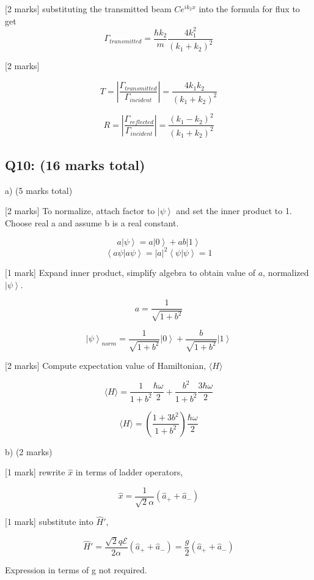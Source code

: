 \documentclass[a4paper,11pt]{article}
\begin{document}
[2 marks] substituting the transmitted beam \( Ce^{ik_{2}x} \) into the formula for flux to get \[\Gamma_{transmitted} = \frac{\hbar k_{2}}{m} \frac{4k_{1}^{2}}{ \left(k_{1} + k_{2} \right)^{2}} \]

[2 marks]

\[ T = \left|\frac{\Gamma_{transmitted}}{\Gamma_{incident}} \right| = \frac{4k_{1}k_{2}}{(k_{1}+k_{2})^{2}} \]

\[R = \left|\frac{\Gamma_{reflected}}{\Gamma_{incident}} \right| = \frac{(k_{1}-k_{2})^{2}}{(k_{1}+k_{2})^{2}} \]

\subsection*{Q10: (16 marks total) }

a) (5 marks total)

[2 marks] To normalize, attach factor to \( \left| \psi \right> \) and set the inner product to 1. Choose real a and assume b is a real constant. 

\[ a \left| \psi \right> = a\left| 0 \right> + ab \left| 1 \right> \]
\[ \left< a\psi | a\psi \right> = |a|^2 \left< \psi | \psi \right> = 1 \]

[1 mark] Expand inner product, simplify algebra to obtain value of \( a \), normalized \( \left| \psi \right> \).

\[ a = \frac{1}{\sqrt{1+b^2}} \]

\[ \left| \psi \right>_{norm} = \frac{1}{\sqrt{1+b^2}} \left| 0 \right> + \frac{b}{\sqrt{1+b^2}} \left| 1 \right> \]

[2 marks] Compute expectation value of Hamiltonian, \( \langle H \rangle \) 

\[ \langle H \rangle = \frac{1}{1+b^2} \frac{\hbar \omega}{2} + \frac{b^2}{1+b^2} \frac{3\hbar \omega}{2} \]

\[ \langle H \rangle = \left ( \frac{1+3b^2}{1+b^2} \right) \frac{\hbar \omega}{2} \]

b) (2 marks)

[1 mark] rewrite \( \hat{x} \) in terms of ladder operators,

\[ \hat{x} = \frac{1}{\sqrt{2} \alpha} (\hat{a}_{+} + \hat{a}_{-}) \]

[1 mark] substitute into \( \hat{H}' \), 

\[ \hat{H}' = \frac{\sqrt{2} q \mathcal{E}}{2 \alpha} (\hat{a}_{+} + \hat{a}_{-}) = \frac{g}{2} (\hat{a}_{+} + \hat{a}_{-}) \]

Expression in terms of g not required. 
\end{document}
